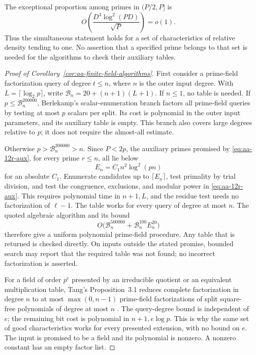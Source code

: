 \documentclass[11pt]{article}
\theoremstyle{definition}
\theoremstyle{remark}
\begin{document}
The exceptional proportion among primes in \((P/2,P]\) is
\[
 O\!\left(\frac{D^3\log^2(PD)}{\sqrt P}\right)=o(1).
\]
Thus the simultaneous statement holds for a set of characteristics
of relative density tending to one. No assertion that a specified
prime belongs to that set is needed for the algorithms to check
their auxiliary tables.

\begin{proof}[Proof of Corollary~\ref{cor:aa-finite-field-algorithms}]
First consider a prime-field factorization query of degree \(t\leq n\),
where \(n\) is the outer input degree. With
\(L=\lceil\log_2p\rceil\), write
\(\mathcal B_n=20+(n+1)(L+1)\).
If \(n\leq1\), no table is needed.
If \(p\leq\mathcal B_n^{200000}\), Berlekamp's scalar-enumeration
branch factors all prime-field queries by testing at most \(p\)
scalars per split. Its cost is polynomial in the outer
input parameters, and its auxiliary table is empty.
This branch also covers large degrees relative to \(p\); it does
not require the almost-all estimate.

Otherwise \(p>\mathcal B_n^{200000}>n\). Since \(P<2p\), the
auxiliary primes promised by \eqref{eq:aa-12r-aux}, for every
prime \(r\leq n\), all lie below
\[
 E_n=C_1 n^2\log^2(pn)
\]
for an absolute \(C_1\). Enumerate candidates up to
\(\lceil E_n\rceil\), test primality by trial division, and test
the congruence, exclusions, and modular power in
\eqref{eq:aa-12r-aux}. This requires polynomial time in
\(n+1,L\), and the residue test needs no factorization of
\(\ell-1\). The table works for every query of degree at most \(n\).
The quoted algebraic algorithm and its bound
\[
 O\bigl(\mathcal B_n^{500000}
             +\mathcal B_n^{100}E_n^{20}\bigr)
\]
therefore give a uniform polynomial prime-field procedure.
Any table that is returned is checked directly. On inputs outside
the stated promise, bounded search may report that the required
table was not found; no incorrect factorization is asserted.

For a field of order \(p^e\) presented by an irreducible
quotient or an equivalent multiplication table, Tang's
Proposition~3.1 reduces complete factorization in degree \(n\) to
at most \(\max(0,n-1)\) prime-field factorizations of split
square-free polynomials of degree at most \(n\)
\citep[pp.~4--5]{Tang2026}.
The query-degree bound is independent of \(e\); the remaining
bit cost is polynomial in \(n+1,e\log p\).
This is why the same set of good characteristics works for
every presented extension, with no bound on \(e\).
The input is promised to be a field and its polynomial is nonzero.
A nonzero constant has an empty factor list.


\end{proof}
\end{document}
